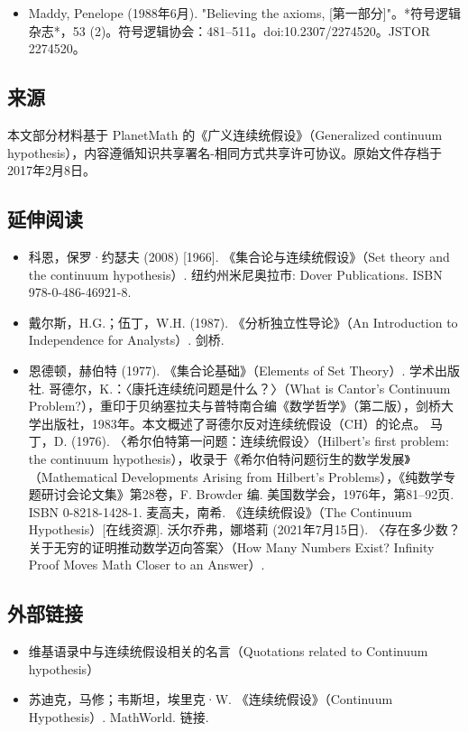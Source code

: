 \begin{itemize}
\item Maddy, Penelope (1988年6月). "Believing the axioms, [第一部分]"。*符号逻辑杂志*，53 (2)。符号逻辑协会：481–511。doi:10.2307/2274520。JSTOR 2274520。
\end{itemize}
\subsection{来源}
本文部分材料基于 PlanetMath 的《广义连续统假设》（Generalized continuum hypothesis），内容遵循知识共享署名-相同方式共享许可协议。原始文件存档于2017年2月8日。

\subsection{延伸阅读}
\begin{itemize}
\item 科恩，保罗·约瑟夫 (2008) [1966]. 《集合论与连续统假设》（Set theory and the continuum hypothesis）. 纽约州米尼奥拉市: Dover Publications. ISBN 978-0-486-46921-8.
\item 戴尔斯，H.G.；伍丁，W.H. (1987). 《分析独立性导论》（An Introduction to Independence for Analysts）. 剑桥.
\item 恩德顿，赫伯特 (1977). 《集合论基础》（Elements of Set Theory）. 学术出版社.
哥德尔，K.：〈康托连续统问题是什么？〉（What is Cantor's Continuum Problem?），重印于贝纳塞拉夫与普特南合编《数学哲学》（第二版），剑桥大学出版社，1983年。本文概述了哥德尔反对连续统假设（CH）的论点。
马丁，D. (1976). 〈希尔伯特第一问题：连续统假设〉（Hilbert's first problem: the continuum hypothesis），收录于《希尔伯特问题衍生的数学发展》（Mathematical Developments Arising from Hilbert's Problems），《纯数学专题研讨会论文集》第28卷，F. Browder 编. 美国数学会，1976年，第81–92页. ISBN 0-8218-1428-1.
麦高夫，南希. 《连续统假设》（The Continuum Hypothesis）[在线资源].
沃尔乔弗，娜塔莉 (2021年7月15日). 〈存在多少数？关于无穷的证明推动数学迈向答案〉（How Many Numbers Exist? Infinity Proof Moves Math Closer to an Answer）.
\end{itemize}
\subsection{外部链接}
\begin{itemize}
\item 维基语录中与连续统假设相关的名言（Quotations related to Continuum hypothesis）
\item 苏迪克，马修；韦斯坦，埃里克·W. 《连续统假设》（Continuum Hypothesis）. MathWorld. 链接.
\end{itemize}

